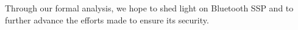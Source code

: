 \documentclass{acm_proc_article-sp}
\begin{document}
Through our formal analysis, we hope to shed light on Bluetooth SSP and to further advance the efforts made to ensure its security.


\nocite{*}

\end{document}
